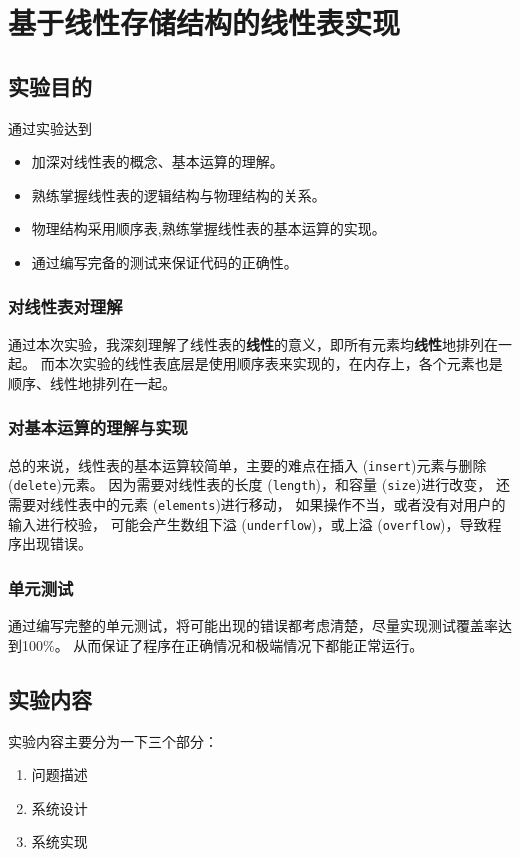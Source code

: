 \chapter{基于线性存储结构的线性表实现}\label{chapter:1}

\section{实验目的}\label{sec:1}
通过实验达到
\begin{itemize}
    \item 加深对线性表的概念、基本运算的理解。
    \item 熟练掌握线性表的逻辑结构与物理结构的关系。
    \item 物理结构采用顺序表,熟练掌握线性表的基本运算的实现。
    \item 通过编写完备的测试来保证代码的正确性。
\end{itemize}

\subsection{对线性表对理解}
通过本次实验，我深刻理解了线性表的\textbf{线性}的意义，即所有元素均\textbf{线性}地排列在一起。
\newline
而本次实验的线性表底层是使用顺序表来实现的，在内存上，各个元素也是顺序、线性地排列在一起。
\subsection{对基本运算的理解与实现}
总的来说，线性表的基本运算较简单，主要的难点在插入 (\texttt{insert})元素与删除 (\texttt{delete})元素。
因为需要对线性表的长度 (\texttt{length})，和容量 (\texttt{size})进行改变，
还需要对线性表中的元素 (\texttt{elements})进行移动，
如果操作不当，或者没有对用户的输入进行校验，
可能会产生数组下溢 (\texttt{underflow})，或上溢 (\texttt{overflow})，导致程序出现错误。
\subsection{单元测试}
通过编写完整的单元测试，将可能出现的错误都考虑清楚，尽量实现测试覆盖率达到100\%。
从而保证了程序在正确情况和极端情况下都能正常运行。


\section{实验内容}\label{sec:2}
    实验内容主要分为一下三个部分：
\begin{enumerate}
    \item 问题描述
    \item 系统设计
    \item 系统实现
\end{enumerate}
